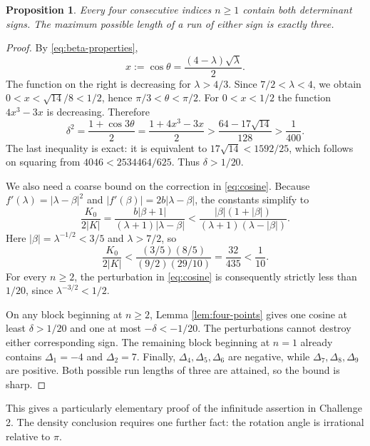 \documentclass[11pt,letterpaper]{article}
\newtheorem{proposition}[theorem]{Proposition}
\theoremstyle{definition}
\newcommand{\Delt}{\Delta}
\numberwithin{equation}{section}
\begin{document}
\begin{proposition}\label{prop:four-block}
Every four consecutive indices $n\ge1$ contain both determinant signs.
The maximum possible length of a run of either sign is exactly three.
\end{proposition}
\begin{proof}
By \eqref{eq:beta-properties},
\begin{equation}\label{eq:cos-theta}
x:=\cos\theta=\frac{(4-\lambda)\sqrt\lambda}{2}.
\end{equation}
The function on the right is decreasing for $\lambda>4/3$.
Since $7/2<\lambda<4$, we obtain
$0<x<\sqrt{14}/8<1/2$, hence $\pi/3<\theta<\pi/2$.
For $0<x<1/2$ the function $4x^3-3x$ is decreasing. Therefore
\begin{equation}\label{eq:delta-margin}
\delta^2=\frac{1+\cos3\theta}{2}
=\frac{1+4x^3-3x}{2}
>\frac{64-17\sqrt{14}}{128}>\frac1{400}.
\end{equation}
The last inequality is exact: it is equivalent to
$17\sqrt{14}<1592/25$, which follows on squaring from
$4046<2534464/625$.
Thus $\delta>1/20$.

We also need a coarse bound on the correction in \eqref{eq:cosine}.
Because $f'(\lambda)=|\lambda-\beta|^2$ and
$|f'(\beta)|=2b|\lambda-\beta|$, the constants simplify to
\begin{equation}\label{eq:correction-ratio}
\frac{K_0}{2|K|}
=\frac{b|\beta+1|}{(\lambda+1)|\lambda-\beta|}
<\frac{|\beta|(1+|\beta|)}{(\lambda+1)(\lambda-|\beta|)}.
\end{equation}
Here $|\beta|=\lambda^{-1/2}<3/5$ and $\lambda>7/2$, so
\[
\frac{K_0}{2|K|}
<\frac{(3/5)(8/5)}{(9/2)(29/10)}
=\frac{32}{435}<\frac1{10}.
\]
For every $n\ge2$, the perturbation in \eqref{eq:cosine} is consequently
strictly less than $1/20$, since $\lambda^{-3/2}<1/2$.

On any block beginning at $n\ge2$, Lemma \ref{lem:four-points} gives
one cosine at least $\delta>1/20$ and one at most $-\delta<-1/20$.
The perturbations cannot destroy either corresponding sign.
The remaining block beginning at $n=1$ already contains
$\Delt_1=-4$ and $\Delt_2=7$.
Finally, $\Delt_4,\Delt_5,\Delt_6$ are negative, while
$\Delt_7,\Delt_8,\Delt_9$ are positive. Both possible run lengths of
three are attained, so the bound is sharp.
\end{proof}

This gives a particularly elementary proof of the infinitude assertion
in Challenge 2. The density conclusion requires one further fact:
the rotation angle is irrational relative to $\pi$.
\end{document}
